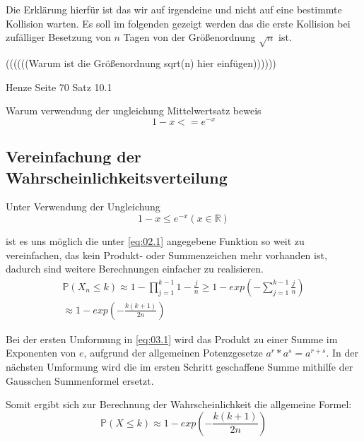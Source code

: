\documentclass[../main.tex]{subfiles}
\begin{document}
\begin{flushleft}
Die Erklärung hierfür ist das wir auf irgendeine und nicht auf eine bestimmte Kollision warten. Es soll im folgenden gezeigt werden das die erste Kollision bei zufälliger Besetzung von $n$ Tagen von der Größenordnung $\sqrt{n}$ ist. \newline

((((((Warum ist die Größenordnung sqrt(n) hier einfügen)))))) \newline

Henze Seite 70 Satz 10.1  \newline


Warum verwendung der ungleichung Mittelwertsatz beweis
\begin{equation}
1 - x <= e^{-x}
\end{equation}

\subsection{Vereinfachung der Wahrscheinlichkeitsverteilung}

Unter Verwendung der Ungleichung
\begin{equation}
1 - x \leq e^{ -x } (x \in \mathbb{R})
\end{equation}




ist es uns möglich die unter \autoref{eq:02.1} angegebene Funktion so weit zu vereinfachen, das kein Produkt- oder Summenzeichen mehr vorhanden ist, dadurch sind weitere Berechnungen einfacher zu realisieren.
\begin{eqnarray}
\mathbb{P}(X_{ n } \leq k) \approx 1 - \prod_{ j = 1 }^{ k - 1 }{ 1 - \frac{ j }{ n } } \geq 1 - exp( - \sum_{ j = 1 }^{ k - 1 }{ \frac{ j }{ n } } )  \label{eq:03.1}\\
\approx 1 - exp( - \frac{ k (k + 1) }{ 2n } )  \label{eq:03.2}
\end{eqnarray}

Bei der ersten Umformung in \autoref{eq:03.1} wird das Produkt zu einer Summe im Exponenten von $e$, aufgrund der allgemeinen Potenzgesetze  $a^{ r } * a^{ s } = a^{ r + s }$. In der nächsten Umformung wird die im ersten Schritt geschaffene Summe mithilfe der Gausschen Summenformel ersetzt. \newline

Somit ergibt sich zur Berechnung der Wahrscheinlichkeit die allgemeine Formel:
\begin{equation}
\mathbb{P}(X \leq k) \approx 1 - exp( - \frac{ k (k + 1) }{ 2n } ) \label{eq:04}
\end{equation}

\end{flushleft}
\end{document}
